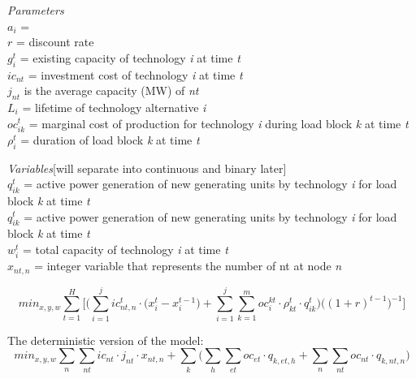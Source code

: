 \documentclass[10pt]{amsart}
\begin{document}
\begin{flushleft}
\textit{Parameters} \\
$a_i$ = \\
$r$ = discount rate \\
$g_i^t$ = existing capacity of technology \textit{i} at time \textit{t} \\
$ic_{nt}$ = investment cost of technology \textit{i} at time \textit{t} \\
$j_{nt}$ is the average capacity (MW) of \textit{nt} \\
$L_i$ = lifetime of technology alternative \textit{i} \\
$oc_{ik}^{t}$ = marginal cost of production for technology \textit{i} during load block \textit{k} at time \textit{t} \\
$\rho_{i}^{t}$ = duration of load block \textit{k} at time \textit{t} \\
\end{flushleft}

\begin{flushleft}
\textit{Variables}[will separate into continuous and binary later] \\
$q_{ik}^{t}$ = active power generation of new generating units by technology \textit{i} for load block \textit{k} at time \textit{t} \\
$q_{ik}^{t}$ = active power generation of new generating units by technology \textit{i} for load block \textit{k} at time \textit{t} \\
$w_{i}^{t}$ = total capacity of technology \textit{i} at time \textit{t} \\
$x_{nt, n}$ = integer variable that represents the number of nt at node \textit{n} \\
\end{flushleft}

\begin{equation}
min_{x,y,w} \sum_{t=1}^{H}\bigg[\bigg(\sum_{i=1}^{j} ic_{nt, n}^{t}\cdot \big(x_{i}^{t} - x_{i}^{t-1}\big) + \sum_{i=1}^{j} \sum_{k=1}^{m} oc_{i}^{kt}\cdot \rho_{kt}^{t}\cdot q_{ik}^{t} \bigg)\bigg((1+ r)^{t-1}\bigg)^{-1}\bigg]
\end{equation}

The deterministic version of the model: 
\begin{equation}\label{Lopez.2007}
min_{x,y,w} \sum_{n} \sum_{nt} ic_{nt}\cdot j_{nt}\cdot x_{nt, n}  + \sum_{k} \bigg(\sum_{h}\sum_{et}oc_{et}\cdot q_{k,et,h} + \sum_{n}\sum_{nt} oc_{nt}\cdot q_{k,nt,n}\bigg) 
\end{equation}
\end{document}

